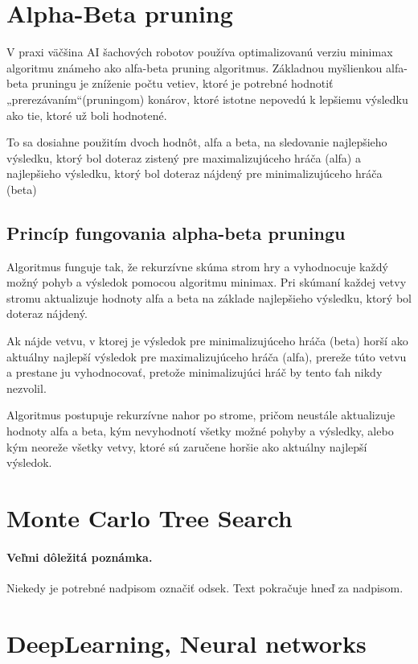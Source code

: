 \documentclass[10pt,twoside,slovak,a4paper]{article}
\begin{document}
\section{Alpha-Beta pruning} \label{alpha-beta}
V praxi väčšina AI šachových robotov používa optimalizovanú verziu minimax algoritmu známeho ako alfa-beta pruning algoritmus. Základnou myšlienkou alfa-beta pruningu je zníženie počtu vetiev, ktoré je potrebné hodnotiť „prerezávaním“(pruningom) konárov, ktoré istotne nepovedú k lepšiemu výsledku ako tie, ktoré už boli hodnotené. 

To sa dosiahne použitím dvoch hodnôt, alfa a beta, na sledovanie najlepšieho výsledku, ktorý bol doteraz zistený pre maximalizujúceho hráča (alfa) a najlepšieho výsledku, ktorý bol doteraz nájdený pre minimalizujúceho hráča (beta)

\subsection{Princíp fungovania alpha-beta pruningu} \label{principAlpha-beta}
Algoritmus funguje tak, že rekurzívne skúma strom hry a vyhodnocuje každý možný pohyb a výsledok pomocou algoritmu minimax. Pri skúmaní každej vetvy stromu aktualizuje hodnoty alfa a beta na základe najlepšieho výsledku, ktorý bol doteraz nájdený. 

Ak nájde vetvu, v ktorej je výsledok pre minimalizujúceho hráča (beta) horší ako aktuálny najlepší výsledok pre maximalizujúceho hráča (alfa), prereže túto vetvu a prestane ju vyhodnocovať, pretože minimalizujúci hráč by tento ťah nikdy nezvolil. 

Algoritmus postupuje rekurzívne nahor po strome, pričom neustále aktualizuje hodnoty alfa a beta, kým nevyhodnotí všetky možné pohyby a výsledky, alebo kým neoreže všetky vetvy, ktoré sú zaručene horšie ako aktuálny najlepší výsledok.


\section{Monte Carlo Tree Search} \label{MonteCarlo}

\paragraph{Veľmi dôležitá poznámka.}
Niekedy je potrebné nadpisom označiť odsek. Text pokračuje hneď za nadpisom.



\section{DeepLearning, Neural networks} \label{DeepNeural}
\end{document}
